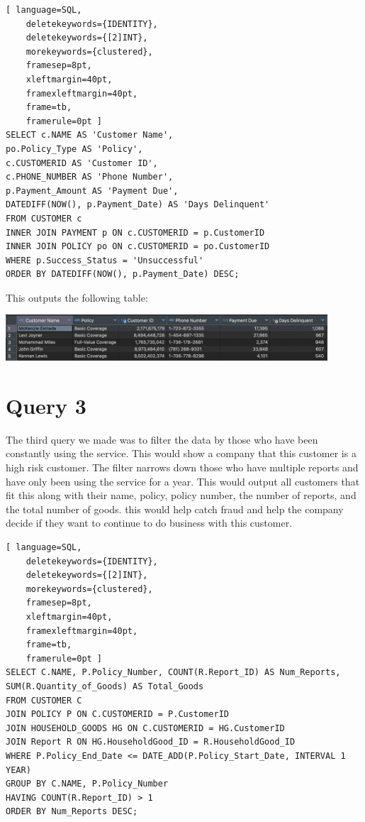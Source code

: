 \documentclass{article}
\begin{document}
\begin{lstlisting}[ language=SQL,
    deletekeywords={IDENTITY},
    deletekeywords={[2]INT},
    morekeywords={clustered},
    framesep=8pt,
    xleftmargin=40pt,
    framexleftmargin=40pt,
    frame=tb,
    framerule=0pt ]
SELECT c.NAME AS 'Customer Name', 
po.Policy_Type AS 'Policy', 
c.CUSTOMERID AS 'Customer ID', 
c.PHONE_NUMBER AS 'Phone Number', 
p.Payment_Amount AS 'Payment Due',
DATEDIFF(NOW(), p.Payment_Date) AS 'Days Delinquent' 
FROM CUSTOMER c
INNER JOIN PAYMENT p ON c.CUSTOMERID = p.CustomerID
INNER JOIN POLICY po ON c.CUSTOMERID = po.CustomerID
WHERE p.Success_Status = 'Unsuccessful'
ORDER BY DATEDIFF(NOW(), p.Payment_Date) DESC;    
\end{lstlisting}

This outputs the following table:

\begin{center}
    \includegraphics[width=0.9\textwidth]{./images/Q2a.png}
\end{center}

\section*{Query 3}

The third query we made was to filter the data by those who have been constantly using the service. This would show a company that this customer is a high risk customer. The filter narrows down those who have multiple reports and have only been using the service for a year. This would output all customers that fit this along with their name, policy, policy number, the number of reports, and the total number of goods. this would help catch fraud and help the company decide if they want to continue to do business with this customer.

\begin{lstlisting}[ language=SQL,
    deletekeywords={IDENTITY},
    deletekeywords={[2]INT},
    morekeywords={clustered},
    framesep=8pt,
    xleftmargin=40pt,
    framexleftmargin=40pt,
    frame=tb,
    framerule=0pt ]
SELECT C.NAME, P.Policy_Number, COUNT(R.Report_ID) AS Num_Reports, SUM(R.Quantity_of_Goods) AS Total_Goods
FROM CUSTOMER C
JOIN POLICY P ON C.CUSTOMERID = P.CustomerID
JOIN HOUSEHOLD_GOODS HG ON C.CUSTOMERID = HG.CustomerID
JOIN Report R ON HG.HouseholdGood_ID = R.HouseholdGood_ID
WHERE P.Policy_End_Date <= DATE_ADD(P.Policy_Start_Date, INTERVAL 1 YEAR)
GROUP BY C.NAME, P.Policy_Number
HAVING COUNT(R.Report_ID) > 1
ORDER BY Num_Reports DESC;
\end{lstlisting}
\end{document}
